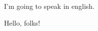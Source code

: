 \documentclass{article}
\newif\ifbr
\begin{document}
\ifbr
Vou falar em português: 

\begin{center}
   Oi, pessoal!
\end{center}
\else
I'm going to speak in english.

\begin{center}
   Hello, folks!
\end{center}
\fi
\end{document}
